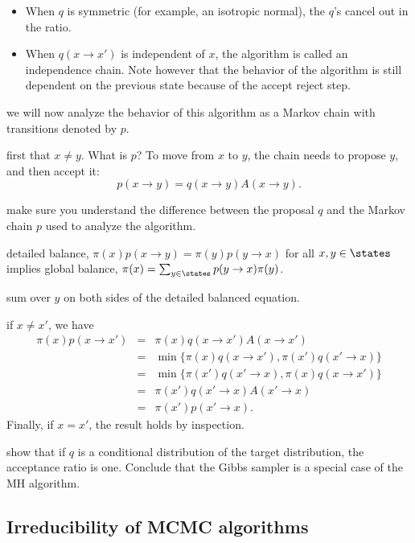 \documentclass{article}
\begin{document}
\begin{itemize}
  \item When $q$ is symmetric (for example, an isotropic normal), the $q$'s cancel out in the ratio. 
  \item When $q(x \to x')$ is independent of $x$, the algorithm is called an independence chain. Note however that the behavior of the algorithm is still dependent on the previous state because of the accept reject step.
\end{itemize}

 we will now analyze the behavior of this algorithm as a Markov chain with transitions denoted by $p$.

 first that $x \neq y$. What is $p$? To move from $x$ to $y$, the chain needs to propose $y$, and then accept it:
\[ p(x \to y) = q(x \to y) A(x \to y). \] 

 make sure you understand the difference between the proposal $q$ and the Markov chain $p$ used to analyze the algorithm.

 detailed balance, $\pi(x) p(x \to y) = \pi(y) p(y \to x)$ for all $x,y\in\states$ implies global balance, $\pi(x) = \sum_{y\in\states} p(y \to x) \pi(y)$. 

 sum over $y$ on both sides of the detailed balanced equation.

 if $x \neq x'$, we have
\begin{eqnarray*}
\pi(x) p(x \to x') &=& \pi(x) q(x \to x') A(x \to x') \\
&=& \min\{ \pi(x) q(x \to x'), \pi(x') q(x' \to x) \} \\
&=& \min\{ \pi(x') q(x' \to x), \pi(x) q(x \to x')\} \\
&=& \pi(x') q(x' \to x) A(x' \to x) \\
&=& \pi(x') p(x' \to x).
\end{eqnarray*}
Finally, if $x = x'$, the result holds by inspection.

 show that if $q$ is a conditional distribution of the target distribution, the acceptance ratio is one. Conclude that the Gibbs sampler is a special case of the MH algorithm.


\subsection{Irreducibility of MCMC algorithms}
\end{document}
